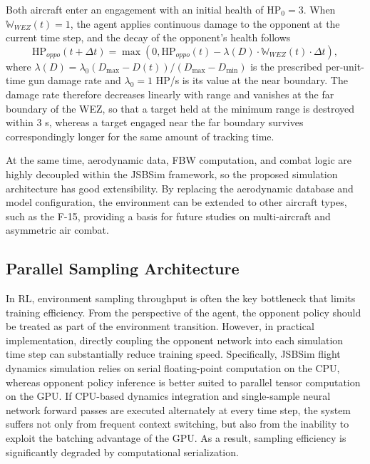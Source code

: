 \documentclass[pdflatex,sn-mathphys-num]{sn-jnl}%
\theoremstyle{thmstyleone}%
\theoremstyle{thmstyletwo}%
\theoremstyle{thmstylethree}%
\begin{document}
Both aircraft enter an engagement with an initial health of $\mathrm{HP}_{0} = 3$. When $\mathbb{W}_{WEZ}(t) = 1$, the agent applies continuous damage to the opponent at the current time step, and the decay of the opponent's health follows
\begin{equation}
    \text{HP}_{oppo}(t+\Delta t) = \max\left(0, \text{HP}_{oppo}(t) - \lambda(D) \cdot \mathbb{W}_{WEZ}(t) \cdot \Delta t \right)
    \label{eq:damage},
\end{equation}
where $\lambda(D) = \lambda_{0}\left(D_{\max}-D(t)\right)/\left(D_{\max}-D_{\min}\right)$ is the prescribed per-unit-time gun damage rate and $\lambda_{0} = 1$ HP/s is its value at the near boundary. The damage rate therefore decreases linearly with range and vanishes at the far boundary of the WEZ, so that a target held at the minimum range is destroyed within $3$ s, whereas a target engaged near the far boundary survives correspondingly longer for the same amount of tracking time.

At the same time, aerodynamic data, FBW computation, and combat logic are highly decoupled within the JSBSim framework, so the proposed simulation architecture has good extensibility. By replacing the aerodynamic database and model configuration, the environment can be extended to other aircraft types, such as the F-15, providing a basis for future studies on multi-aircraft and asymmetric air combat.

\subsection{Parallel Sampling Architecture}
\label{sec:parallel_acceleration}

In RL, environment sampling throughput is often the key bottleneck that limits training efficiency. From the perspective of the agent, the opponent policy should be treated as part of the environment transition. However, in practical implementation, directly coupling the opponent network into each simulation time step can substantially reduce training speed. Specifically, JSBSim flight dynamics simulation relies on serial floating-point computation on the CPU, whereas opponent policy inference is better suited to parallel tensor computation on the GPU. If CPU-based dynamics integration and single-sample neural network forward passes are executed alternately at every time step, the system suffers not only from frequent context switching, but also from the inability to exploit the batching advantage of the GPU. As a result, sampling efficiency is significantly degraded by computational serialization.
\end{document}

